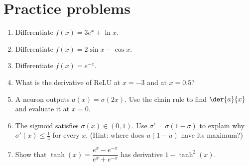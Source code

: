 \section*{Practice problems}
\begin{enumerate}[label=\textbf{\thechapter.\arabic*}]
  \item Differentiate $f(x)=3e^x+\ln x$.
  \item Differentiate $f(x)=2\sin x-\cos x$.
  \item Differentiate $f(x)=e^{-x}$.
  \item What is the derivative of $\mathrm{ReLU}$ at $x=-3$ and at $x=0.5$?
  \item A neuron outputs $a(x)=\sigma(2x)$. Use the chain rule to find $\der{a}{x}$ and evaluate it at $x=0$.
  \item The sigmoid satisfies $\sigma(x)\in(0,1)$. Use $\sigma'=\sigma(1-\sigma)$ to explain why $\sigma'(x)\le \tfrac14$ for every $x$. (Hint: where does $u(1-u)$ have its maximum?)
  \item[\textbf{5.7}$\star$] Show that $\tanh(x)=\dfrac{e^x-e^{-x}}{e^x+e^{-x}}$ has derivative $1-\tanh^2(x)$.
\end{enumerate}

